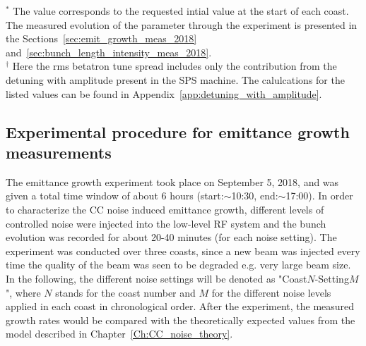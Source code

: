 \begin{table}[!hbt]
\begin{minipage}{\textwidth}
\begin{centering}
\begin{tabu}
      \bottomrule
	\end{tabu}
   \label{tab:machine_beam_param_2018}
   \end{centering} \footnotesize{$^\ast$ The value corresponds to the requested intial value at the start of each coast. The measured evolution of the parameter through the experiment is presented in the Sections~\ref{sec:emit_growth_meas_2018} and~\ref{sec:bunch_length_intensity_meas_2018}.\\$^\dagger$ Here the rms betatron tune spread includes only the contribution from the detuning with amplitude present in the SPS machine. The calulcations for the listed values can be found in Appendix~\ref{app:detuning_with_amplitude}.}
   \end{minipage}
\end{table}


\subsection{Experimental procedure for emittance growth measurements}\label{sec:experimental_procedure_2018}
The emittance growth experiment took place on September 5, 2018, and was given a total time window of about 6 hours (start:$\sim$10:30, end:$\sim$17:00). In order to characterize the CC noise induced emittance growth, different levels of controlled noise were injected into the low-level RF system and the bunch evolution was recorded for about 20-40 minutes (for each noise setting). The experiment was conducted over three coasts, since a new beam was injected every time the quality of the beam was seen to be degraded e.g. very large beam size. In the following, the different noise settings will be denoted as "Coast$N$-Setting$M$", where $N$ stands for the coast number and $M$ for the different noise levels applied in each coast in chronological order. After the experiment, the measured growth rates would be compared with the theoretically expected values from the model described in Chapter~\ref{Ch:CC_noise_theory}.

